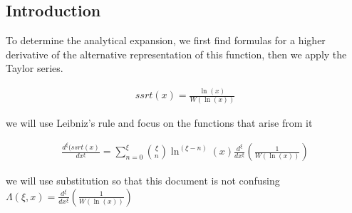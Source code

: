 \section{}

\subsection{Introduction}

To determine the analytical expansion, we first find formulas 
for a higher derivative of the alternative representation of this function, 
then we apply the Taylor series.
  
\begin{align}
    ssrt(x) = \frac{\ln(x)}{W(\ln(x))}
\end{align}

we will use Leibniz's rule and focus 
on the functions that arise from it

\begin{align}
    \frac{d^\xi(ssrt(x)}{dx^\xi}
    =\sum_{n=0}^\xi \binom{\xi}{n}\ln^{(\xi-n)}(x)\frac{d^\xi}{dx^\xi}\left(\frac{1}{W(\ln(x))}\right)
\end{align}

we will use substitution so that this document 
is not confusing $\Lambda(\xi, x)= \frac{d^\xi}{dx^\xi}\left(\frac{1}{W(\ln(x))}\right)$
